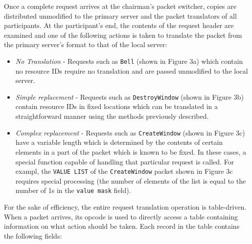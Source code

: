 Once a complete request arrives at the chairman's packet switcher,
copies are distributed unmodified to the primary server and the packet
translators of all participants.  At the participant's end, the contents
of the request header are examined and one of the following actions is
taken to translate the packet from the primary server's format to that
of the local server:


\begin{itemize}

\item {\it No Translation} - Requests such as {\tt Bell} (shown in
Figure 3a) which contain no resource IDs require no translation and
are passed unmodified to the local server.

\item {\it Simple replacement} - Requests such as {\tt DestroyWindow}
(shown in Figure 3b) contain resource IDs in fixed locations which can
be translated in a straightforward manner using the methods previously
described.

\item {\it Complex replacement} - Requests such as {\tt CreateWindow}
(shown in Figure 3c) have a variable length which is determined by the
contents of certain elements in a part of the packet which is known to
be fixed.  In these cases, a special function capable of handling that
particular request is called.
For exampl, the {\tt VALUE LIST} of the {\tt CreateWindow} packet
shown in Figure 3c requires special processing (the number of 
elements of the list is equal to the number of 1s in the 
{\tt value mask} field).

\end{itemize}

For the sake of efficiency, the entire request translation operation is
table-driven.  When a packet arrives, its opcode is used to directly
access a table containing information on what action should be taken.
Each record in the table contains the following fields:

